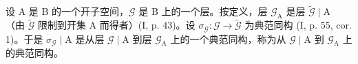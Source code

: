 设 A 是 B 的一个开子空间，\(\mathcal{G}\) 是 B 上的一个层。按定义，层 \(\mathcal{G}_{\mathrm{A}}\) 是层 \(\widetilde{\mathcal{G}}\mid \mathrm{A}\) （由 \(\widetilde{\mathcal{G}}\) 限制到开集 A 而得者）(I, p. 43)。设 \(\sigma_{\mathcal{G}}\colon \mathcal{G}\to \widetilde{\mathcal{G}}\) 为典范同构 (I, p. 55, cor. 1)。于是 \(\sigma_{\mathcal{G}}\mid \mathrm{A}\) 是从层 \(\mathcal{G}\mid \mathrm{A}\) 到层 \(\mathcal{G}_{\mathrm{A}}\) 上的一个典范同构，称为从 \(\mathcal{G}\mid \mathrm{A}\) 到 \(\mathcal{G}_{\mathrm{A}}\) 上的典范同构。

